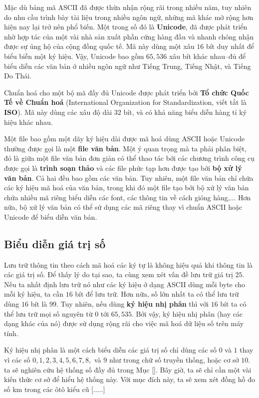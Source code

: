 Mặc dù bảng mã ASCII đã được thừa nhận rộng rãi trong nhiều năm, tuy nhiên do nhu cầu trình
bày tài liệu trong nhiều ngôn ngữ, những mã khác mở rộng hơn hiện nay lại trở nên phổ
biến. Một trong số đó là \textbf{Unicode}, đã được phát triển nhờ hợp tác của một vài nhà
sản xuất phần cứng hàng đầu và nhanh chóng nhận được sự ủng hộ của cộng đồng quốc tế. Mã
này dùng một xâu $16$ bít duy nhất để biểu biễn một ký hiệu. Vậy, Unicode bao gồm $65,536$
xâu bít khác nhau--đủ để biểu diễn các văn bản ở nhiều ngôn ngữ như Tiếng Trung, Tiếng
Nhật, và Tiếng Do Thái.

Chuẩn hoá cho một bộ mã đầy đủ Unicode được phát triển bởi \textbf{Tổ chức Quốc Tế về
  Chuẩn hoá} (International Organization for Standardization, viết tắt là
\textbf{ISO}). Mã này dùng các xâu độ dài $32$ bít, và có khả năng biểu diễn hàng tỉ ký
hiệu khác nhau.

Một file bao gồm một dãy ký hiệu dài được mã hoá dùng ASCII hoặc Unicode thường được gọi
là một \textbf{file văn bản}. Một ý quan trọng mà ta phải phân biệt, đó là giữa một file
văn bản đơn giản có thể thao tác bởi các chương trình công cụ được gọi là \textbf{trình
  soạn thảo} và các file phức tạp hơn được tạo bởi \textbf{bộ xử lý văn bản}. Cả hai đều
bao gồm các văn bản. Tuy nhiên, một file văn bản chỉ chứa các ký hiệu mã hoá của văn bản,
trong khi đó một file tạo bởi bộ xử lý văn bản chứa nhiều mã riêng biểu diễn các font, các
thông tin về cách gióng hàng,... Hơn nữa, bộ xử lý văn bản có thể sử dụng các mã riêng
thay vì chuẩn ASCII hoặc Unicode để biểu diễn văn bản.

\subsection*{Biểu diễn giá trị số}

Lưu trữ thông tin theo cách mã hoá các ký tự là không hiệu quả khi thông tin là các giá
trị số. Để thấy lý do tại sao, ta cùng xem xét vấn đề lưu trữ giá trị $25$. Nếu ta nhất
định lưu trữ nó như các ký hiệu ở dạng ASCII dùng mỗi byte cho mỗi ký hiệu, ta cần $16$
bít để lưu trữ. Hơn nữa, số lớn nhất ta có thể lưu trữ dùng $16$ bít là $99$. Tuy nhiên,
nếu dùng \textbf{ký hiệu nhị phân} thì với $16$ bít ta có thể lưu trữ mọi số nguyên từ $0$
tới $65,535$. Bởi vậy, ký hiệu nhị phân (hay các dạng khác của nó) được sử dụng rộng rãi
cho việc mã hoá dữ liệu số trên máy tính.

Ký hiệu nhị phân là một cách biểu diễn các giá trị số chỉ dùng các số $0$ và $1$ thay vì
các số $0, 1, 2 , 3, 4, 5, 6, 7, 8, $ và $9$ như trong chữ số truyền thống, hoặc cơ sở
$10$. ta sẽ nghiên cứu hệ thống số đầy đủ trong Mục \ref{}. Bây giờ, ta sẽ chỉ cần một vài
kiến thức cơ sở để hiểu hệ thống này. Với mục đích này, ta sẽ xem xét đồng hồ đo số km
trong các ôtô kiểu cũ [.....]

